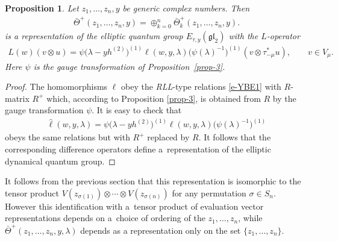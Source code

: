 \documentclass[10pt,a4paper]{amsart}
\numberwithin{equation}{section}
\newtheorem{Proposition}[Theorem]{Proposition}
 { \theoremstyle{definition}
\newtheorem{Definition}[Theorem]{Definition}
\newtheorem{Example}[Theorem]{Example}
\newtheorem{Remark}[Theorem]{Remark} }
\begin{document}
\begin{Proposition}\label{prop-7} Let $z_1,\dots,z_n,y$ be generic complex numbers. Then
 \begin{gather*}
 \bar\Theta^+(z_1,\dots,z_n,y)=\oplus_{k=0}^n\bar\Theta^+_k(z_1,\dots,z_n,y).
 \end{gather*}
 is a representation of the elliptic quantum group $E_{\tau,y}(\mathfrak{gl}_2)$ with the $L$-operator
 \begin{gather*}
 L(w)(v\otimes u)=\psi\big(\lambda-yh^{(2)}\big)^{(1)}\ell(w,y,\lambda)\big(\psi(\lambda)^{-1}\big)^{(1)}(v\otimes\tau_{-\mu}^*u),\qquad v\in V_\mu.
 \end{gather*}
 Here $\psi$ is the gauge transformation of Proposition~{\rm \ref{prop-3}}.
\end{Proposition}
\begin{proof}The homomorphisms $\ell$ obey the {\em RLL}-type relations \eqref{e-YBE1} with $R$-matrix $R^+$ which, according to Proposition \ref{prop-3}, is obtained from $R$ by the gauge transformation $\psi$. It is easy to check that
\begin{gather*}
 \hat\ell(w,y,\lambda)= \psi\big(\lambda-yh^{(2)}\big)^{(1)}\ell(w,y,\lambda)\big(\psi(\lambda)^{-1}\big)^{(1)}
\end{gather*}
obeys the same relations but with $R^+$ replaced by $R$. It follows that the corresponding difference operators define a~representation of the elliptic dynamical quantum group.
\end{proof}

\begin{Remark} It follows from the previous section that this representation is isomorphic to the tensor product $V(z_{\sigma(1)})\otimes\cdots\otimes V(z_{\sigma(n)})$ for any permutation $\sigma\in S_n$. However this identification with a~tensor product of evaluation vector representations depends on a~choice of ordering of the $z_1,\dots,z_n$, while $\bar\Theta^+(z_1,\dots,z_n,y,\lambda)$ depends as a representation only on the set $\{z_1,\dots, z_n\}$.
\end{Remark}
\end{document}
